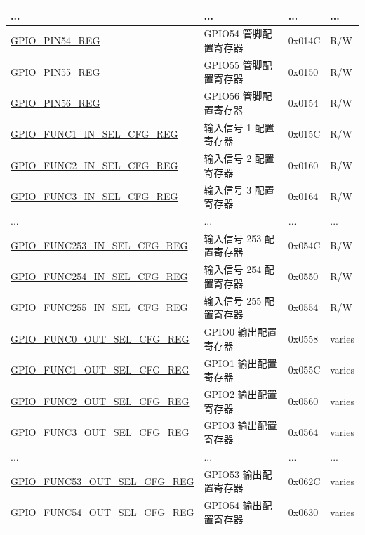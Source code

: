 \begin{longtable}{ | p{5.8cm} | p{7.2cm} | p{1.3cm} | p{2.2cm} | }
... & ... & ... & ... \\ \hline
\hyperref[regdesc:GPIOPINNREG]{GPIO\_PIN54\_REG} & GPIO54 管脚配置寄存器 & 0x014C & R/W \\ \hline
\hyperref[regdesc:GPIOPINNREG]{GPIO\_PIN55\_REG} & GPIO55 管脚配置寄存器 & 0x0150 & R/W \\ \hline
\hyperref[regdesc:GPIOPINNREG]{GPIO\_PIN56\_REG} & GPIO56 管脚配置寄存器 & 0x0154 & R/W \\ \hline
\hyperref[regdesc:GPIOFUNCNINSELCFGREG]{GPIO\_FUNC1\_IN\_SEL\_CFG\_REG} & 输入信号 1 配置寄存器 & 0x015C & R/W \\ \hline
\hyperref[regdesc:GPIOFUNCNINSELCFGREG]{GPIO\_FUNC2\_IN\_SEL\_CFG\_REG} & 输入信号 2 配置寄存器 & 0x0160 & R/W \\ \hline
\hyperref[regdesc:GPIOFUNCNINSELCFGREG]{GPIO\_FUNC3\_IN\_SEL\_CFG\_REG} & 输入信号 3 配置寄存器 & 0x0164 & R/W \\ \hline
... & ... & ... & ... \\ \hline
\hyperref[regdesc:GPIOFUNCNINSELCFGREG]{GPIO\_FUNC253\_IN\_SEL\_CFG\_REG} & 输入信号 253 配置寄存器 & 0x054C & R/W \\ \hline
\hyperref[regdesc:GPIOFUNCNINSELCFGREG]{GPIO\_FUNC254\_IN\_SEL\_CFG\_REG} & 输入信号 254 配置寄存器 & 0x0550 & R/W \\ \hline
\hyperref[regdesc:GPIOFUNCNINSELCFGREG]{GPIO\_FUNC255\_IN\_SEL\_CFG\_REG} & 输入信号 255 配置寄存器 & 0x0554 & R/W \\ \hline
\hyperref[regdesc:GPIOFUNCNOUTSELCFGREG]{GPIO\_FUNC0\_OUT\_SEL\_CFG\_REG} & GPIO0 输出配置寄存器 & 0x0558 & varies \\ \hline
\hyperref[regdesc:GPIOFUNCNOUTSELCFGREG]{GPIO\_FUNC1\_OUT\_SEL\_CFG\_REG} & GPIO1 输出配置寄存器 & 0x055C & varies \\ \hline
\hyperref[regdesc:GPIOFUNCNOUTSELCFGREG]{GPIO\_FUNC2\_OUT\_SEL\_CFG\_REG} & GPIO2 输出配置寄存器 & 0x0560 & varies \\ \hline
\hyperref[regdesc:GPIOFUNCNOUTSELCFGREG]{GPIO\_FUNC3\_OUT\_SEL\_CFG\_REG} & GPIO3 输出配置寄存器 & 0x0564 & varies \\ \hline
... & ... & ... & ... \\ \hline
\hyperref[regdesc:GPIOFUNCNOUTSELCFGREG]{GPIO\_FUNC53\_OUT\_SEL\_CFG\_REG} & GPIO53 输出配置寄存器 & 0x062C & varies \\ \hline
\hyperref[regdesc:GPIOFUNCNOUTSELCFGREG]{GPIO\_FUNC54\_OUT\_SEL\_CFG\_REG} & GPIO54 输出配置寄存器 & 0x0630 & varies \\ \hline

\end{longtable}
